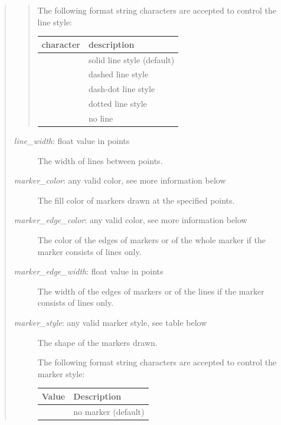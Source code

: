 \documentclass[letterpaper,10pt,english]{sphinxmanual}
\begin{document}
\begin{fulllineitems}
\begin{fulllineitems}
\begin{quote}
\begin{quote}
The following format string characters are accepted to control
the line style:

\begin{tabulary}{\linewidth}{|L|L|}
\hline
\textbf{
character
} & \textbf{
description
}\\\hline

 & 
solid line style (default)
\\\hline

 & 
dashed line style
\\\hline

 & 
dash-dot line style
\\\hline

 & 
dotted line style
\\\hline

 & 
no line
\\\hline
\end{tabulary}

\end{quote}
\begin{description}
\item[{\emph{line\_width}: float value in points}] \leavevmode
The width of lines between points.

\item[{\emph{marker\_color}: any valid color, see more information below}] \leavevmode
The fill color of markers drawn at the specified points.

\item[{\emph{marker\_edge\_color}: any valid color, see more information below}] \leavevmode
The color of the edges of markers or of the whole marker if the
marker consists of lines only.

\item[{\emph{marker\_edge\_width}: float value in points}] \leavevmode
The width of the edges of markers or of the lines if the marker 
consists of lines only.

\item[{\emph{marker\_style}: any valid marker style, see table below}] \leavevmode
The shape of the markers drawn.

The following format string characters are accepted to control
the marker style:

\begin{tabulary}{\linewidth}{|L|L|}
\hline
\textbf{
Value
} & \textbf{
Description
}\\\hline

 & 
no marker (default)
\\\hline


\end{tabulary}
\end{description}
\end{quote}
\end{fulllineitems}
\end{fulllineitems}
\end{document}
